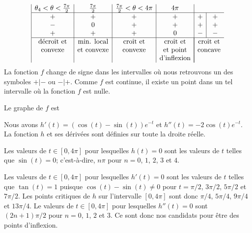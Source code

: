 {\[\begin{array}{|c|c|c|c|c|c}
\theta_4 < \theta < \frac{7\pi}{2} & \frac{7\pi}{2} &
\frac{7\pi}{2} < \theta < 4\pi & 4\pi\\
\hline
+ & + & + & + & + & + \\
- & 0 & + & + & + & + \\
+ & + & + & 0 & - & - \\
\hline
\text{décroît et} & \text{min. local} & \text{croît et} &
\text{croît et} & \multicolumn{2}{|c}{\text{croît et}} \\
\text{convexe} & \text{et convexe} & \text{convexe} & \text{et point} &
\multicolumn{2}{|c}{\text{concave}} \\
& & & \text{d'inflexion} & \multicolumn{2}{|c}{}
\end{array}
\]
La fonction $f$ change de signe dans les intervalles où nous retrouvons un des
symboles $+|-$ ou $-|+$.  Comme $f$ est continue, il existe un point dans
un tel intervalle où la fonction $f$ est nulle.

Le graphe de $f$ est

Nous avons $\displaystyle h'(t) = \left(\cos(t)- \sin(t)\right) e^{-t}$ et
$\displaystyle h''(t)= -2\cos(t)e^{-t}$.  La fonction $h$ et ses dérivées
sont définies sur toute la droite réelle.

Les valeurs de $t \in [0, 4\pi]$ pour lesquelles $h(t) = 0$ sont les valeurs
de $t$ telles que $\sin(t) = 0$; c'est-à-dire, $n \pi$ pour $n=0$, $1$, $2$,
$3$ et $4$.

Les valeurs de $t \in [0, 4\pi]$ pour lesquelles $h'(t) = 0$ sont les valeurs
de $t$ telles que $\tan(t) = 1$ puisque $\cos(t)-\sin(t) \neq 0$ pour
$t=\pi/2$, $3\pi/2$, $5\pi/2$ et $7\pi/2$.  Les points critiques de $h$
sur l'intervalle $[0,4\pi]$ sont donc $\pi/4$, $5\pi/4$, $9\pi/4$ et $13\pi/4$.
Le valeurs de $t \in [0,4\pi]$ pour lesquelles $h''(t)=0$ sont
$(2n+1)\pi/2$ pour $n=0$, $1$, $2$ et $3$.   Ce sont donc nos candidats pour
être des points d'inflexion.

}
